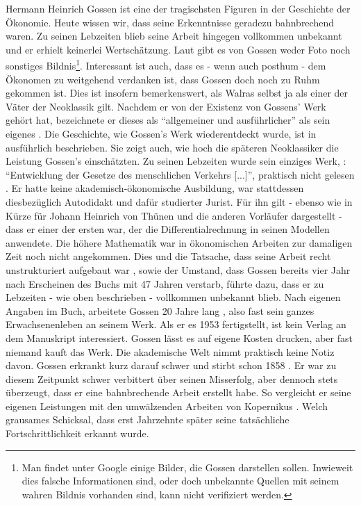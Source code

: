 Hermann Heinrich Gossen ist eine der tragischsten Figuren in der Geschichte der Ökonomie. Heute wissen wir, dass seine Erkenntnisse geradezu bahnbrechend waren. Zu seinen Lebzeiten blieb seine Arbeit hingegen vollkommen unbekannt und er erhielt keinerlei Wertschätzung. Laut \textcite{Kurz2009} gibt es von Gossen weder Foto noch sonstiges Bildnis\footnote{Man findet unter Google einige Bilder, die Gossen darstellen sollen. Inwieweit dies falsche Informationen sind, oder doch unbekannte Quellen mit seinem wahren Bildnis vorhanden sind, kann nicht verifiziert werden.}. Interessant ist auch, dass es - wenn auch posthum - dem Ökonomen \textcite{Walras1885} zu weitgehend verdanken ist, dass Gossen doch noch zu Ruhm gekommen ist. Dies ist insofern bemerkenswert, als Walras selbst ja als einer der Väter der Neoklassik gilt. Nachdem er von der Existenz von Gossens' Werk gehört hat, bezeichnete er dieses als "`allgemeiner und ausführlicher"' als sein eigenes \parencite[S. 1]{Kurz2009}. Die Geschichte, wie Gossen's Werk wiederentdeckt wurde, ist in \textcite{Ikeda2000} ausführlich beschrieben. Sie zeigt auch, wie hoch die späteren Neoklassiker die Leistung Gossen's einschätzten.
Zu seinen Lebzeiten wurde sein einziges Werk, \textcite{Gossen1854}: "`Entwicklung der Gesetze des menschlichen Verkehrs [...]"', praktisch nicht gelesen \parencite[S. 282]{Rosner2012}. Er hatte keine akademisch-ökonomische Ausbildung, war stattdessen diesbezüglich Autodidakt \parencite[S. 3]{Kurz2009} und dafür studierter Jurist. Für ihn gilt - ebenso wie in Kürze für Johann Heinrich von Thünen und die anderen Vorläufer dargestellt - dass er einer der ersten war, der die Differentialrechnung in seinen Modellen anwendete. Die höhere Mathematik war in ökonomischen Arbeiten zur damaligen Zeit noch nicht angekommen. Dies und die Tatsache, dass seine Arbeit \parencite{Gossen1854} recht unstrukturiert aufgebaut war \parencite[S. 20]{Kurz2009}, sowie der Umstand, dass Gossen bereits vier Jahr nach Erscheinen des Buchs mit 47 Jahren verstarb, führte dazu, dass er zu Lebzeiten - wie oben beschrieben - vollkommen unbekannt blieb. Nach eigenen Angaben im Buch, arbeitete Gossen 20 Jahre lang \parencite[S. 3]{Kurz2009}, also fast sein ganzes Erwachsenenleben an seinem Werk. Als er es 1953 fertigstellt, ist kein Verlag an dem Manuskript interessiert. Gossen lässt es auf eigene Kosten drucken, aber fast niemand kauft das Werk. Die akademische Welt nimmt praktisch keine Notiz davon. Gossen erkrankt kurz darauf schwer und stirbt schon 1858 \parencite[S.4]{Kurz2009}. Er war zu diesem Zeitpunkt schwer verbittert über seinen Misserfolg, aber dennoch stets überzeugt, dass er eine bahnbrechende Arbeit erstellt habe. So vergleicht er seine eigenen Leistungen mit den umwälzenden Arbeiten von Kopernikus \parencite{Kurz2009, Gossen1854}. Welch grausames Schicksal, dass erst Jahrzehnte später seine tatsächliche Fortschrittlichkeit erkannt wurde.

